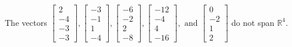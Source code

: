 \begin{exercise}
\begin{exerciseStatement}
  \end{exerciseStatement}
  \begin{exerciseAnswer}
   The vectors \(\left[\begin{array}{r}
2 \\
-4 \\
-3 \\
-3
\end{array}\right] , \left[\begin{array}{r}
-3 \\
-1 \\
1 \\
-4
\end{array}\right] , \left[\begin{array}{r}
-6 \\
-2 \\
2 \\
-8
\end{array}\right] , \left[\begin{array}{r}
-12 \\
-4 \\
4 \\
-16
\end{array}\right] , \text{ and } \left[\begin{array}{r}
0 \\
-2 \\
1 \\
2
\end{array}\right]\) 
  	 do not  
	span \(\mathbb{R}^4\).
  


  \end{exerciseAnswer}
\end{exercise}